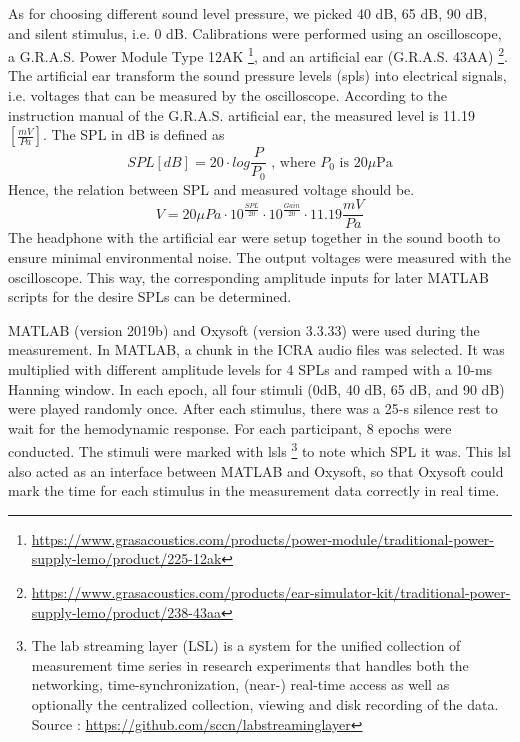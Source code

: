 As for choosing different sound level pressure, we picked 40 dB, 65 dB, 90 dB, and silent stimulus, i.e. 0 dB. Calibrations were performed using an oscilloscope, a G.R.A.S. Power Module Type 12AK \footnote {\url{https://www.grasacoustics.com/products/power-module/traditional-power-supply-lemo/product/225-12ak}},  and an artificial ear (G.R.A.S. 43AA) \footnote {\url {https://www.grasacoustics.com/products/ear-simulator-kit/traditional-power-supply-lemo/product/238-43aa}}. The artificial ear transform the sound pressure levels (\acrshort{spl}s) into electrical signals, i.e. voltages that can be measured by the oscilloscope. According to the instruction manual of the G.R.A.S. artificial ear, the measured level is 11.19 $[ \frac {mV}{Pa}]$. The SPL in dB is defined as 
\begin{equation}
SPL [dB] = 20 \cdot log \frac{P}{P_0} \text{ , where $P_0$ is $20 \mu$Pa}
\end{equation}
Hence, the relation between SPL and measured voltage should be.
\begin{equation}
V = 20{ \mu Pa} \cdot 10^{\frac {SPL}{20}}  \cdot 10^{\frac{Gain}{20}} \cdot 11.19 {\frac {mV}{Pa}} 
\end{equation}
The headphone with the artificial ear were setup together in the sound booth to ensure minimal environmental noise. The output voltages were measured with the oscilloscope. This way, the corresponding amplitude inputs for later MATLAB scripts for the desire SPLs can be determined.

MATLAB (version 2019b) and Oxysoft (version 3.3.33) were used during the measurement. In MATLAB, a chunk in the ICRA audio files was selected. It was multiplied with different amplitude levels for 4 SPLs and ramped with a 10-ms Hanning window. In each epoch, all four stimuli (0dB, 40 dB, 65 dB, and 90 dB) were played randomly once. After each stimulus, there was a 25-s silence rest to wait for the hemodynamic response. For each participant, 8 epochs were conducted. The stimuli were marked with \acrlong{lsl}s \footnote {The lab streaming layer (LSL) is a system for the unified collection of measurement time series in research experiments that handles both the networking, time-synchronization, (near-) real-time access as well as optionally the centralized collection, viewing and disk recording of the data. Source : \url{https://github.com/sccn/labstreaminglayer}} to note which SPL it was. This \acrlong {lsl} also acted as an interface between MATLAB and Oxysoft, so that Oxysoft could mark the time for each stimulus in the measurement data correctly in real time.

